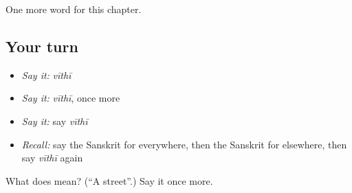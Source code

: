 \begin{grammarlens}[title={What you've built}]
One more word for this chapter.
\end{grammarlens}

\subsection*{Your turn}
\begin{itemize}
\raggedright
  \item \emph{Say it:} \emph{vīthī}
  \item \emph{Say it:} \emph{vīthī}, once more
  \item \emph{Say it:} say \emph{vīthī}
  \item \emph{Recall:} say the Sanskrit for everywhere, then the Sanskrit for elsewhere, then say \emph{vīthī} again
\end{itemize}

\begin{tcolorbox}[breakable,colback=teal!4,colframe=teal!35!black,title={Before you move on}]
What does  mean? (\textquotedblleft{}A street\textquotedblright{}.) Say it once more.
\end{tcolorbox}

